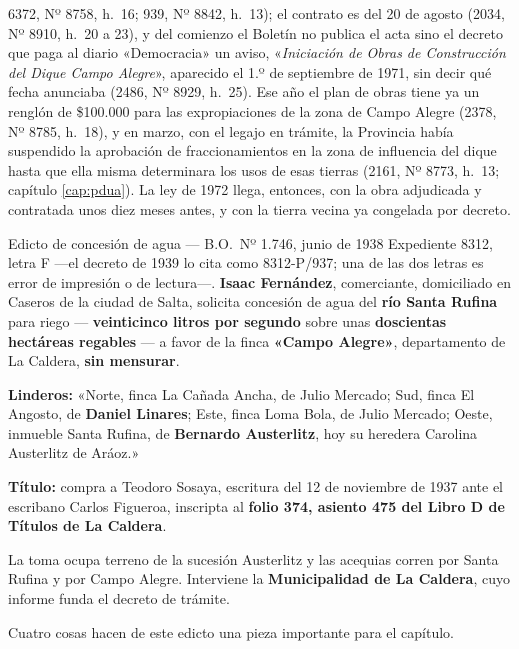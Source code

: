 6372, Nº 8758, h.\ 16; 939, Nº 8842, h.\ 13); el contrato es del 20 de agosto (2034, Nº 8910, h.\ 20 a 23), y del comienzo el Boletín no publica el acta sino el decreto que paga al diario «Democracia» un aviso, «\textit{Iniciación de Obras de Construcción del Dique Campo Alegre}», aparecido el 1.º de septiembre de 1971, sin decir qué fecha anunciaba (2486, Nº 8929, h.\ 25). Ese año el plan de obras tiene ya un renglón de \$100.000 para las expropiaciones de la zona de Campo Alegre (2378, Nº 8785, h.\ 18), y en marzo, con el legajo en trámite, la Provincia había suspendido la aprobación de fraccionamientos en la zona de influencia del dique hasta que ella misma determinara los usos de esas tierras (2161, Nº 8773, h.\ 13; capítulo \ref{cap:pdua}). La ley de 1972 llega, entonces, con la obra adjudicada y contratada unos diez meses antes, y con la tierra vecina ya congelada por decreto.

\begin{ficha}{Edicto de concesión de agua --- B.O.\ Nº 1.746, junio de 1938}
Expediente 8312, letra F ---el decreto de 1939 lo cita como 8312-P/937; una de las dos letras es error de impresión o de lectura---. \textbf{Isaac Fernández}, comerciante, domiciliado en Caseros de la
ciudad de Salta, solicita concesión de agua del \textbf{río Santa Rufina} para riego ---
\textbf{veinticinco litros por segundo} sobre unas \textbf{doscientas hectáreas regables} ---
a favor de la finca \textbf{«Campo Alegre»}, departamento de La Caldera, \textbf{sin
mensurar}.

\textbf{Linderos:} «Norte, finca La Cañada Ancha, de Julio Mercado; Sud, finca El Angosto, de
\textbf{Daniel Linares}; Este, finca Loma Bola, de Julio Mercado; Oeste, inmueble Santa
Rufina, de \textbf{Bernardo Austerlitz}, hoy su heredera Carolina Austerlitz de Aráoz.»

\textbf{Título:} compra a Teodoro Sosaya, escritura del 12 de noviembre de 1937 ante el
escribano Carlos Figueroa, inscripta al \textbf{folio 374, asiento 475 del Libro D de Títulos
de La Caldera}.

La toma ocupa terreno de la sucesión Austerlitz y las acequias corren por Santa Rufina y por
Campo Alegre. Interviene la \textbf{Municipalidad de La Caldera}, cuyo informe funda el
decreto de trámite.
\end{ficha}

Cuatro cosas hacen de este edicto una pieza importante para el capítulo.

